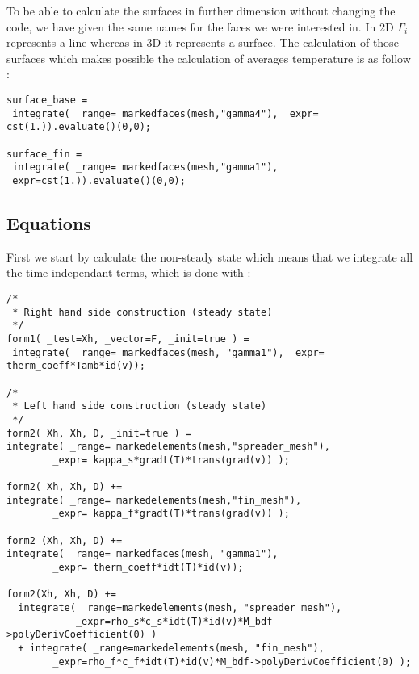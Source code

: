 To be able to calculate the surfaces in further dimension without changing the code, we have given the same names for the faces we were interested in. In 2D $\Gamma_i$ represents a line whereas in 3D it represents a surface. The calculation of those surfaces which makes possible the calculation of averages temperature is as follow :
\begin{lstlisting}
surface_base = 
 integrate( _range= markedfaces(mesh,"gamma4"), _expr= cst(1.)).evaluate()(0,0);

surface_fin = 
 integrate( _range= markedfaces(mesh,"gamma1"), _expr=cst(1.)).evaluate()(0,0);
\end{lstlisting}

\subsection{Equations}
\label{heat:eq_impl}
First we start by calculate the non-steady state which means that we integrate all the time-independant terms, which is done with :
\begin{lstlisting}
/*
 * Right hand side construction (steady state)
 */
form1( _test=Xh, _vector=F, _init=true ) = 
 integrate( _range= markedfaces(mesh, "gamma1"), _expr= therm_coeff*Tamb*id(v));

/*
 * Left hand side construction (steady state)
 */
form2( Xh, Xh, D, _init=true ) = 
integrate( _range= markedelements(mesh,"spreader_mesh"), 
		_expr= kappa_s*gradt(T)*trans(grad(v)) );

form2( Xh, Xh, D) += 
integrate( _range= markedelements(mesh,"fin_mesh"), 
		_expr= kappa_f*gradt(T)*trans(grad(v)) );

form2 (Xh, Xh, D) += 
integrate( _range= markedfaces(mesh, "gamma1"), 
		_expr= therm_coeff*idt(T)*id(v));

form2(Xh, Xh, D) +=
  integrate( _range=markedelements(mesh, "spreader_mesh"), 
	      	_expr=rho_s*c_s*idt(T)*id(v)*M_bdf->polyDerivCoefficient(0) )
  + integrate( _range=markedelements(mesh, "fin_mesh"), 
		_expr=rho_f*c_f*idt(T)*id(v)*M_bdf->polyDerivCoefficient(0) );
\end{lstlisting}

